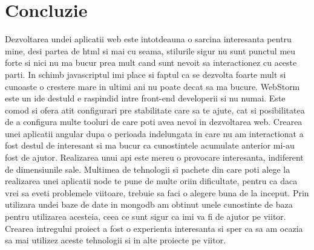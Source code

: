 \section*{Concluzie}

Dezvoltarea undei aplicatii web este intotdeauna o sarcina interesanta pentru mine, desi partea de html si mai cu seama, stilurile sigur nu sunt punctul meu forte si nici nu ma bucur prea mult cand sunt nevoit sa interactionez cu aceste parti. In schimb javascriptul imi place si faptul ca se dezvolta foarte mult si cunoaste o crestere mare in ultimi ani nu poate decat sa ma bucure. 
WebStorm este un ide destuld e raspindid intre front-end developerii si nu numai. Este comod si ofera atit configurari pre stabilitate care sa te ajute, cat si posibilitatea de a configura multe tooluri de care poti avea nevoi in dezvoltarea web. Crearea unei aplicatii angular dupa o perioada indelungata in care nu am interactionat a fost destul de interesant si ma bucur ca cunostintele acumulate anterior mi-au fost de ajutor. 
Realizarea unui api este mereu o provocare interesanta, indiferent de dimensiunile sale. Multimea de tehnologii si pachete din care poti alege la realizarea unei aplicatii  node te pune de multe oriin dificultate, pentru ca daca vrei sa eveti problemele viitoare, trebuie sa faci o alegere buna de la inceput. 
Prin utilizara undei baze de date in mongodb am obtinut unele cunostinte de baza pentru utilizarea acesteia, ceea ce sunt sigur ca imi va fi de ajutor pe viitor.  Crearea intregului proiect a fost o experienta interesanta si sper ca sa am ocazia sa mai utilizez aceste tehnologii si in alte proiecte pe viitor.

\clearpage